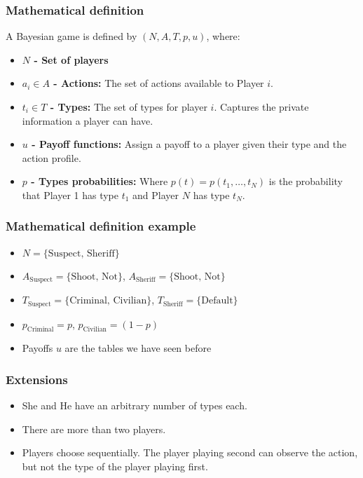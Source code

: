 \documentclass[11pt]{beamer}
\begin{document}
\begin{frame}
    \frametitle{Mathematical definition}

    A Bayesian game is defined by $(N,A,T,p,u)$, where:
    
    \vspace{5mm}
    \begin{itemize}
        \item \textbf{$N$ - Set of players}
        \vspace{2mm}
        \item \textbf{$a_i \in A$ - Actions:} The set of actions available to Player $i$.
        \vspace{2mm}
        \item \textbf{$t_i \in T$ - Types:} The set of types for player $i$. Captures the private information a player can have.
        \vspace{2mm}
        \item \textbf{$u$ - Payoff functions:} Assign a payoff to a player given their type and the action profile.
        \vspace{2mm}
        \item \textbf{$p$ - Types probabilities:} Where $p(t) = p(t_1, \ldots, t_N)$ is the probability that Player 1 has type $t_1$ and Player $N$ has type $t_N$.
    \end{itemize}

\end{frame}

\begin{frame}
    \frametitle{{Mathematical definition example}}
    \begin{itemize}
        \item $N = \{\text{Suspect, Sheriff}\}$
        \item $A_{\text{Suspect}} = \{\text{Shoot, Not}\}$, $A_{\text{Sheriff}} = \{\text{Shoot, Not}\}$
        \item $T_{\text{Suspect}} = \{\text{Criminal, Civilian}\}$, $T_{\text{Sheriff}} = \{ \text{Default} \}$
        \item $p_{\text{Criminal}} = p$, $p_{\text{Civilian}} = (1 - p)$
        \item Payoffs $u$ are the tables we have seen before
    \end{itemize}
\end{frame}


\begin{frame}
    \frametitle{Extensions}
    \begin{itemize}
        \item She and He have an arbitrary number of types each.
        \item There are more than two players.
        \item Players choose sequentially. The player playing second can observe the action, but
        not the type of the player playing first.

    \end{itemize}
\end{frame}
\end{document}
